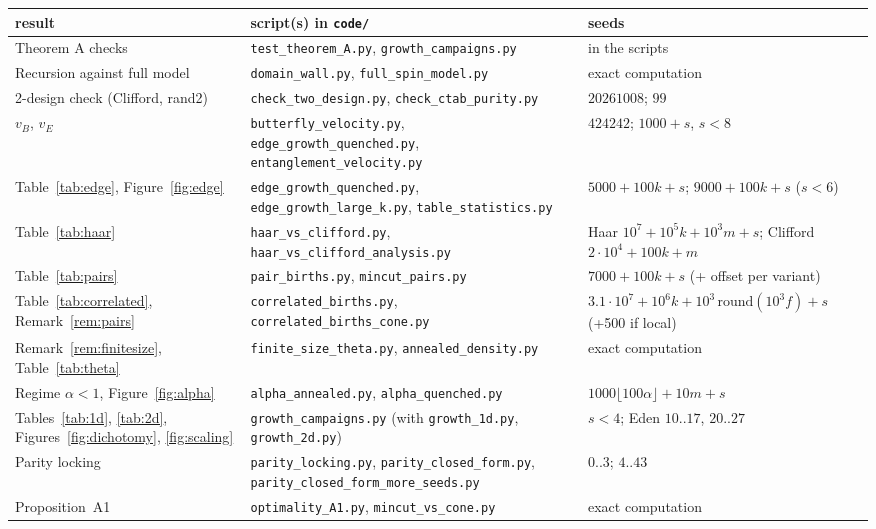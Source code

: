 \begin{table}[h]
\centering\footnotesize\setlength{\tabcolsep}{4pt}
\begin{tabular}{p{4.0cm}p{6.2cm}p{4.9cm}}
\toprule
result & script(s) in \texttt{code/} & seeds\\
\midrule
Theorem A checks & \texttt{test\_theorem\_A.py}, \texttt{growth\_campaigns.py} & in the scripts\\
Recursion against full model & \texttt{domain\_wall.py}, \texttt{full\_spin\_model.py} & exact computation\\
2-design check (Clifford, rand2) & \texttt{check\_two\_design.py}, \texttt{check\_ctab\_purity.py} & $20261008$; $99$\\
$v_B$, $v_E$ & \texttt{butterfly\_velocity.py}, \texttt{edge\_growth\_quenched.py}, \texttt{entanglement\_velocity.py} & $424242$; $1000+s$, $s<8$\\
Table~\ref{tab:edge}, Figure~\ref{fig:edge} & \texttt{edge\_growth\_quenched.py}, \texttt{edge\_growth\_large\_k.py}, \texttt{table\_statistics.py} & $5000+100k+s$; $9000+100k+s$ ($s<6$)\\
Table~\ref{tab:haar} & \texttt{haar\_vs\_clifford.py}, \texttt{haar\_vs\_clifford\_analysis.py} & Haar $10^7+10^5k+10^3m+s$; Clifford $2\cdot10^4+100k+m$\\
Table~\ref{tab:pairs} & \texttt{pair\_births.py}, \texttt{mincut\_pairs.py} & $7000+100k+s$ (+ offset per variant)\\
Table~\ref{tab:correlated}, Remark~\ref{rem:pairs} & \texttt{correlated\_births.py}, \texttt{correlated\_births\_cone.py} & $3.1\cdot10^7+10^6k+10^3\,\mathrm{round}(10^3f)+s$ (+500 if local)\\
Remark~\ref{rem:finitesize}, Table~\ref{tab:theta} & \texttt{finite\_size\_theta.py}, \texttt{annealed\_density.py} & exact computation\\
Regime $\alpha<1$, Figure~\ref{fig:alpha} & \texttt{alpha\_annealed.py}, \texttt{alpha\_quenched.py} & $1000\lfloor100\alpha\rfloor+10m+s$\\
Tables~\ref{tab:1d}, \ref{tab:2d}, Figures~\ref{fig:dichotomy}, \ref{fig:scaling} & \texttt{growth\_campaigns.py} (with \texttt{growth\_1d.py}, \texttt{growth\_2d.py}) & $s<4$; Eden $10..17$, $20..27$\\
Parity locking & \texttt{parity\_locking.py}, \texttt{parity\_closed\_form.py}, \texttt{parity\_closed\_form\_more\_seeds.py} & $0..3$; $4..43$\\
Proposition~A1 & \texttt{optimality\_A1.py}, \texttt{mincut\_vs\_cone.py} & exact computation\\

\end{tabular}
\end{table}
